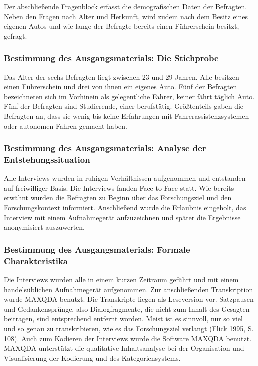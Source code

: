 \documentclass[12pt]{article}
\begin{document}
Der abschließende Fragenblock erfasst die demografischen Daten der Befragten. Neben den Fragen nach Alter und Herkunft, wird zudem nach dem Besitz eines eigenen Autos und wie lange der Befragte bereits einen Führerschein besitzt, gefragt.

\subsubsection*{Bestimmung des Ausgangsmaterials: Die Stichprobe}
Das Alter der sechs Befragten liegt zwischen 23 und 29 Jahren. Alle besitzen einen Führerschein und drei von ihnen ein eigenes Auto. Fünf der Befragten bezeichneten sich im Vorhinein als gelegentliche Fahrer, keiner fährt täglich Auto. Fünf der Befragten sind Studierende, einer berufstätig. Größtenteils gaben die Befragten an, dass sie wenig bis keine Erfahrungen mit Fahrerassistenzsystemen oder autonomen Fahren gemacht haben.

\subsubsection*{Bestimmung des Ausgangsmaterials: Analyse der Entstehungssituation}
Alle Interviews wurden in ruhigen Verhältnissen aufgenommen und entstanden auf freiwilliger Basis. Die Interviews fanden Face-to-Face statt. Wie bereits erwähnt wurden die Befragten zu Beginn über das Forschungsziel und den Forschungskontext informiert. Anschließend wurde die Erlaubnis eingeholt, das Interview mit einem Aufnahmegerät aufzuzeichnen und später die Ergebnisse anonymisiert auszuwerten.

\subsubsection*{Bestimmung des Ausgangsmaterials: Formale Charakteristika}
Die Interviews wurden alle in einem kurzen Zeitraum geführt und mit einem handelsüblichen Aufnahmegerät aufgenommen. Zur anschließenden Transkription wurde MAXQDA benutzt. Die Transkripte liegen als Leseversion vor. Satzpausen und Gedankensprünge, also Dialogfragmente, die nicht zum Inhalt des Gesagten beitragen, sind entsprechend entfernt worden. Meist ist es sinnvoll, nur so viel und so genau zu transkribieren, wie es das Forschungsziel verlangt (Flick 1995, S. 108).
Auch zum Kodieren der Interviews wurde die Software MAXQDA benutzt. MAXQDA unterstützt die qualitative Inhaltsanalyse bei der Organisation und Visualisierung der Kodierung und des Kategoriensystems.
\end{document}
